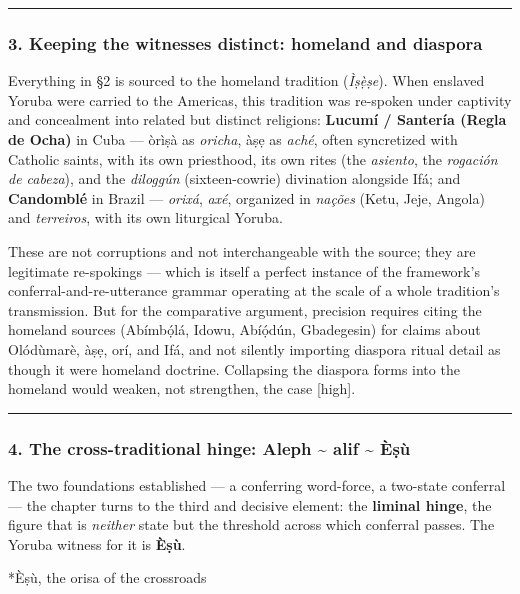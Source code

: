 \documentclass[11pt]{article}
\makeatletter
\renewcommand\paragraph{\@startsection{paragraph}{4}{\z@}{2ex plus 1ex}{0.4ex}{\normalfont\normalsize\bfseries}}
\makeatother
\begin{document}
\medskip\noindent\rule{\linewidth}{0.3pt}\medskip

\subsubsection*{3. Keeping the witnesses distinct: homeland and diaspora}

Everything in §2 is sourced to the homeland tradition (\emph{Ìṣẹ̀ṣe}). When enslaved Yoruba were carried to the Americas, this tradition was re-spoken under captivity and concealment into related but distinct religions: \textbf{Lucumí /\allowbreak{} Santería (Regla de Ocha)} in Cuba — òrìṣà as \emph{oricha}, àṣẹ as \emph{aché}, often syncretized with Catholic saints, with its own priesthood, its own rites (the \emph{asiento}, the \emph{rogación de cabeza}), and the \emph{diloggún} (sixteen-cowrie) divination alongside Ifá; and \textbf{Candomblé} in Brazil — \emph{orixá}, \emph{axé}, organized in \emph{nações} (Ketu, Jeje, Angola) and \emph{terreiros}, with its own liturgical Yoruba.

These are not corruptions and not interchangeable with the source; they are legitimate re-spokings — which is itself a perfect instance of the framework's conferral-and-re-utterance grammar operating at the scale of a whole tradition's transmission. But for the comparative argument, precision requires citing the homeland sources (Abímbọ́lá, Idowu, Abíọ́dún, Gbadegesin) for claims about Olódùmarè, àṣẹ, orí, and Ifá, and not silently importing diaspora ritual detail as though it were homeland doctrine. Collapsing the diaspora forms into the homeland would weaken, not strengthen, the case [high]. 

\medskip\noindent\rule{\linewidth}{0.3pt}\medskip

\subsubsection*{4. The cross-traditional hinge: Aleph \textasciitilde{} alif \textasciitilde{} Èṣù}

The two foundations established — a conferring word-force, a two-state conferral — the chapter turns to the third and decisive element: the \textbf{liminal hinge}, the figure that is \emph{neither} state but the threshold across which conferral passes. The Yoruba witness for it is \textbf{Èṣù}.

\paragraph*{Èṣù, the orisa of the crossroads}
\end{document}
